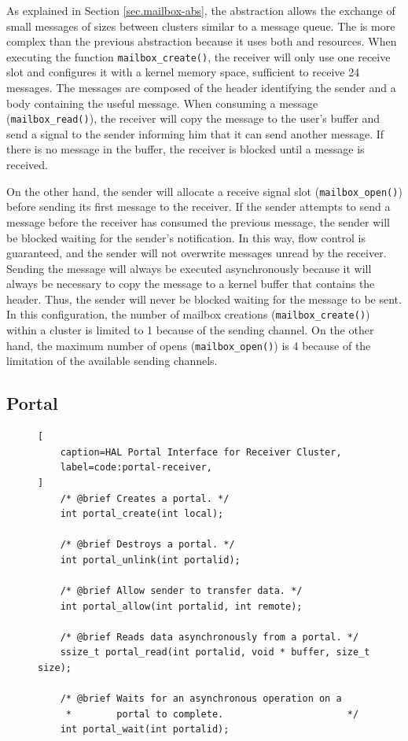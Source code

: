 		As explained in Section \ref{sec.mailbox-abs}, the \mailbox abstraction
		allows the exchange of small messages of sizes between clusters similar
		to a \posis message queue.
		The \mailbox is more complex than the previous abstraction because it
		uses both \dnoc and \cnoc resources.
		When executing the function \texttt{mailbox\_create()}, the receiver
		will only use one \dnoc receive slot and configures it with a kernel
		memory space, sufficient to receive 24 messages.
		The messages are composed of the header identifying the sender
		and a body containing the useful message.
		When consuming a message (\texttt{mailbox\_read()}), the receiver
		will copy the message to the user's buffer and send a signal
		to the sender informing him that it can send another message.
		If there is no message in the buffer, the receiver is blocked
		until a message is received.

		On the other hand, the sender will allocate a receive signal slot (\texttt{mailbox\_open()})
		before sending its first message to the receiver.
		If the sender attempts to send a message before the receiver has consumed
		the previous message, the sender will be blocked waiting for the sender's notification.
		In this way, flow control is guaranteed, and the sender will not overwrite
		messages unread by the receiver.
		Sending the message will always be executed asynchronously
		because it will always be necessary to copy the message to
		a kernel buffer that contains the header.
		Thus, the sender will never be blocked waiting for the message to be sent.
		In this configuration, the number of mailbox creations (\texttt{mailbox\_create()})
		within a cluster is limited to 1 because of the \cnoc sending channel.
		On the other hand, the maximum number of opens (\texttt{mailbox\_open()}) is
		4 because of the limitation of the available \dnoc sending channels.

	\subsection{Portal}

\begin{figure}[t]
\begin{lstlisting}[
	caption=HAL Portal Interface for Receiver Cluster,
	label=code:portal-receiver,
]
	/* @brief Creates a portal. */
	int portal_create(int local);

	/* @brief Destroys a portal. */
	int portal_unlink(int portalid);

	/* @brief Allow sender to transfer data. */
	int portal_allow(int portalid, int remote);

	/* @brief Reads data asynchronously from a portal. */
	ssize_t portal_read(int portalid, void * buffer, size_t size);

	/* @brief Waits for an asynchronous operation on a
	 *        portal to complete.                      */
	int portal_wait(int portalid);
\end{lstlisting}
\end{figure}

